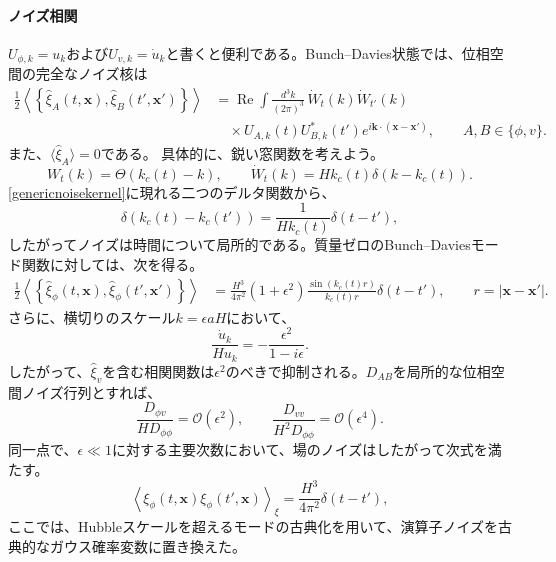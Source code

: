 \documentclass[a4paper,11pt,oneside]{article}
\theoremstyle{definition}
\numberwithin{equation}{section}
\begin{document}
\paragraph{ノイズ相関}



\(U_{\phi,k}=u_{k}\)および\(U_{v,k}=\dot u_{k}\)と書くと便利である。Bunch--Davies状態では、位相空間の完全なノイズ核は
\begin{equation}
\begin{aligned}
\frac{1}{2}
\left\langle
\left\{
\hat\xi_{A}(t,\mathbf{x}),
\hat\xi_{B}(t',\mathbf{x}')
\right\}
\right\rangle
&=
\operatorname{Re}
\int\frac{d^{3}k}{(2\pi)^{3}}\,
\dot W_{t}(k)\dot W_{t'}(k)
\\
&\quad\times
U_{A,k}(t)U_{B,k}^{*}(t')
e^{i\mathbf{k}\cdot(\mathbf{x}-\mathbf{x}')},
\qquad
A,B\in\{\phi,v\}.
\end{aligned}
\label{genericnoisekernel}
\end{equation}
また、\(\langle\hat\xi_{A}\rangle=0\)である。
具体的に、鋭い窓関数を考えよう。
\begin{equation}
W_{t}(k)
=
\Theta(k_{c}(t)-k),
\qquad
\dot W_{t}(k)
=
Hk_{c}(t)\delta(k-k_{c}(t)).
\end{equation}
\eqref{genericnoisekernel}に現れる二つのデルタ関数から、
\begin{equation}
\delta\left(k_{c}(t)-k_{c}(t')\right)
=
\frac{1}{Hk_{c}(t)}\delta(t-t'),
\end{equation}
したがってノイズは時間について局所的である。質量ゼロのBunch--Daviesモード関数に対しては、次を得る。
\begin{align}
\frac{1}{2}
\left\langle
\left\{
\hat\xi_{\phi}(t,\mathbf{x}),
\hat\xi_{\phi}(t',\mathbf{x}')
\right\}
\right\rangle
&=
\frac{H^{3}}{4\pi^{2}}
\left(1+\epsilon^{2}\right)
\frac{\sin\left(k_{c}(t)r\right)}{k_{c}(t)r}
\delta(t-t'),
\qquad
r=|\mathbf{x}-\mathbf{x}'|.
\label{spatialnoisecorrelator}
\end{align}
さらに、横切りのスケール\(k=\epsilon aH\)において、
\begin{equation}
\frac{\dot u_{k}}{Hu_{k}}
=
-\frac{\epsilon^{2}}{1-i\epsilon}.
\end{equation}
したがって、\(\hat\xi_{v}\)を含む相関関数は\(\epsilon^{2}\)のべきで抑制される。\(D_{AB}\)を局所的な位相空間ノイズ行列とすれば、
\begin{equation}
\frac{D_{\phi v}}{H D_{\phi\phi}}
=
\mathcal O(\epsilon^{2}),
\qquad
\frac{D_{vv}}{H^{2}D_{\phi\phi}}
=
\mathcal O(\epsilon^{4}).
\label{velocitynoisesuppression}
\end{equation}
同一点で、\(\epsilon\ll1\)に対する主要次数において、場のノイズはしたがって次式を満たす。
\begin{equation}
\left\langle
\xi_{\phi}(t,\mathbf{x})
\xi_{\phi}(t',\mathbf{x})
\right\rangle_{\xi}
=
\frac{H^{3}}{4\pi^{2}}
\delta(t-t'),
\label{classicalnoisecorrelator}
\end{equation}
ここでは、Hubbleスケールを超えるモードの古典化を用いて、演算子ノイズを古典的なガウス確率変数に置き換えた。
\end{document}
